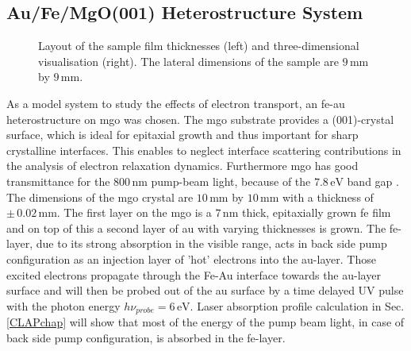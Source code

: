 \documentclass[a4paper,12pt,twoside]{article}
\begin{document}
\subsection{Au/Fe/MgO(001) Heterostructure System}
    \label{chapHS}
    \begin{figure}
		\caption{Layout of the sample film thicknesses (left) and three-dimensional visualisation (right). The lateral dimensions of the sample are $9\,\mathrm{mm}$ by $9\,\mathrm{mm}$.}
	    	\label{samplelayout}
	\end{figure}  
As a model system to study the effects of electron transport, an \gls{fe}-\gls{au} heterostructure on \gls{mgo} was chosen. The \gls{mgo} substrate provides a (001)-crystal surface, which is ideal for epitaxial growth and thus important for sharp crystalline interfaces. This enables to neglect interface scattering contributions in the analysis of electron relaxation dynamics. Furthermore \gls{mgo} has good transmittance for the $800\,\mathrm{\mbox{nm}}$ pump-beam light, because of the $7.8\,\mathrm{eV}$ band gap \cite{NOUROZI20192038}. The dimensions of the \gls{mgo} crystal are $10\,\mathrm{mm}$ by $10\,\mathrm{mm}$ with a thickness of $\pm\,0.02\,\mathrm{mm}$.  The first layer on the \gls{mgo} is a $7\,\mathrm{\mbox{nm}}$ thick, epitaxially grown \gls{fe} film and on top of this a second layer of \gls{au} with varying thicknesses is grown. The \gls{fe}-layer, due to its strong absorption in the visible range, acts in back side pump configuration as an injection layer of 'hot' electrons into the \gls{au}-layer. Those excited electrons propagate through the Fe-Au interface towards the \gls{au}-layer surface and will then be probed out of the \gls{au} surface by a time delayed UV pulse with the photon energy $h\nu_{probe}=6\, \mathrm{eV}$. Laser absorption profile calculation in Sec.\,\ref{CLAPchap} will show  that most of the energy of the pump beam light, in case of back side pump configuration, is absorbed in the \gls{fe}-layer.\\
\end{document}

